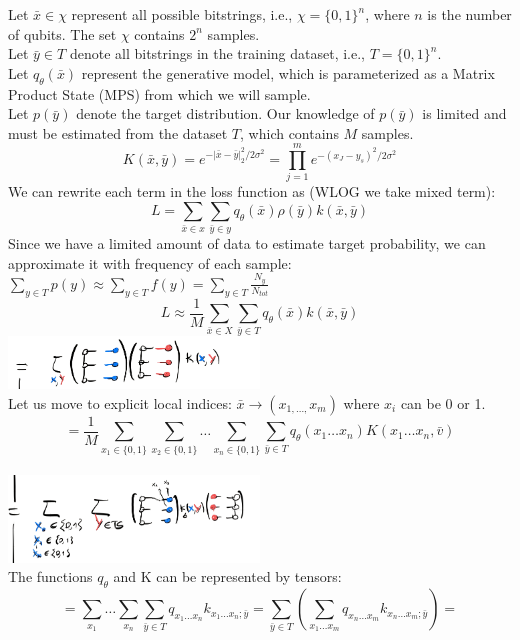 Let $\bar{x} \in \chi$ represent all possible bitstrings, i.e., $\chi = \{0,1\}^n$, where $n$ is the number of qubits. The set $\chi$ contains $2^n$ samples. \\
Let $\bar{y} \in T$ denote all bitstrings in the training dataset, i.e., $T = \{0,1\}^n$. \\
Let $q_{\theta}(\bar{x})$ represent the generative model, which is parameterized as a Matrix Product State (MPS) from which we will sample. \\
Let $p(\bar{y})$ denote the target distribution. Our knowledge of $p(\bar{y})$ is limited and must be estimated from the dataset $T$, which contains $M$ samples.
$$
K(\bar{x}, \bar{y})=e^{-|\bar{x}-\bar{y}|_{2}^{2} / 2 \sigma^{2}}=\prod_{j=1}^{m} e^{-\left(x_{J}-y_{s}\right)^{2} / 2 \sigma^{2}}
$$
We can rewrite each term in the loss function as (WLOG we take mixed term):
$$
L=\sum_{\bar{x} \in x} \sum_{\bar{y} \in y} q_{\theta}(\bar{x}) \rho(\bar{y}) k(\bar{x}, \bar{y})$$
Since we have a limited amount of data to estimate target probability, we can approximate it with frequency of each sample: $\sum_{y \in T} p(y) \approx \sum_{y \in T} f(y) = \sum_{y \in T} \frac{N_y}{N_{tot}}$
$$
L\approx \frac{1}{M} \sum_{\bar{x} \in X} \sum_{\bar{y} \in T}  q_{\theta}(\bar{x}) k(\bar{x}, \bar{y}) 
$$
\includegraphics[max width=0.5\textwidth, center]{images/tn_eq_2.png} \\
Let us move to explicit local indices: $\bar{x} \rightarrow(x_{1, \ldots,} x_{m})$ where $x_i$ can be 0 or 1.
$$
=\frac{1}{M}\sum_{x_{1} \in\{0,1\}} \sum_{x_{2} \in\{0,1\}} \ldots \sum_{x_{n} \in\{0,1\}} \sum_{\bar{y} \in T} q_{\theta}\left(x_{1} \ldots x_{n}\right) K\left(x_{1} \ldots x_{n}, \bar{v}\right)
$$ \\
\includegraphics[max width=0.5\textwidth, center]{images/tn_eq_3.png} \\
The functions $q_{\theta}$ and K can be represented by tensors:
$$
=\sum_{x_{1}} \ldots \sum_{x_{n}} \sum_{\bar{y} \in T} q_{x_{1} \ldots x_{n}} k_{x_{1} \ldots x_{n};\bar{y}} =\sum_{\bar{y} \in T}\left(\sum_{x_{1} \ldots x_{m}} q_{x_{n} \ldots x_{m}} k_{x_{n} \ldots x_{m} ; \bar{y}}\right)=
$$
